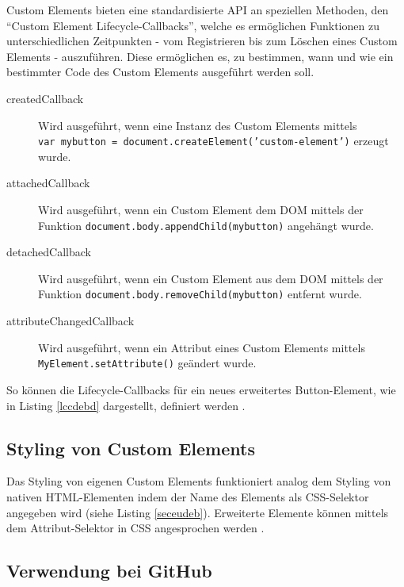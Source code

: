 Custom Elements bieten eine standardisierte \ac{API} an speziellen Methoden, den ``Custom Element Lifecycle-Callbacks'', welche es ermöglichen Funktionen zu unterschiedlichen Zeitpunkten - vom Registrieren bis zum Löschen eines Custom Elements - auszuführen. Diese ermöglichen es, zu bestimmen, wann und wie ein bestimmter Code des Custom Elements ausgeführt werden soll.

\begin{description}
  \item[createdCallback] Wird ausgeführt, wenn eine Instanz des Custom Elements mittels \texttt{var\ mybutton\ =\ document.createElement('custom-element')} erzeugt wurde.
  \item[attachedCallback] Wird ausgeführt, wenn ein Custom Element dem \ac{DOM} mittels der Funktion \texttt{document.body.appendChild(mybutton)} angehängt wurde.
  \item[detachedCallback] Wird ausgeführt, wenn ein Custom Element aus dem \ac{DOM} mittels der Funktion \texttt{document.body.removeChild(mybutton)} entfernt wurde.
  \item[attributeChangedCallback] Wird ausgeführt, wenn ein Attribut eines Custom Elements mittels \texttt{MyElement.setAttribute()} geändert wurde.
\end{description}

So können die Lifecycle-Callbacks für ein neues erweitertes Button-Element, wie in Listing \ref{lccdebd} dargestellt, definiert werden \cite{citeulike:13844988}.




\subsection{Styling von Custom Elements}\label{styling-von-custom-elements}

Das Styling von eigenen Custom Elements funktioniert analog dem Styling von nativen \ac{HTML}-Elementen indem der Name des Elements als \ac{CSS}-Selektor angegeben wird (siehe Listing \ref{seceudeb}). Erweiterte Elemente können mittels dem Attribut-Selektor in \ac{CSS} angesprochen werden \cite[S. 127-138]{citeulike:13844975}.




\subsection{Verwendung bei GitHub}\label{verwendung-bei-github}

